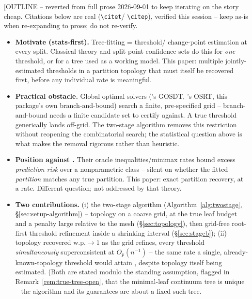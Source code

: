 \documentclass[11pt]{article}
\theoremstyle{plain}
\theoremstyle{definition}
\theoremstyle{remark}
\begin{document}
[OUTLINE -- reverted from full prose 2026-09-01 to keep iterating on the
story cheap. Citations below are real (\texttt{\textbackslash citet}/
\texttt{\textbackslash citep}), verified this session -- keep as-is when
re-expanding to prose; do not re-verify.
\begin{itemize}
\item \textbf{Motivate (stats-first).} Tree-fitting = threshold/
  change-point estimation at every split. Classical theory
  \citep{chan1993,yaoau1989,baiperron1998,boysen2009,seijosen2011} and
  split-point confidence sets \citep{banerjee2007} do this for \emph{one}
  threshold, or for a tree used as a working model. This paper: multiple
  jointly-estimated thresholds in a partition topology that must itself be
  recovered first, before any individual rate is meaningful.
\item \textbf{Practical obstacle.} Global-optimal solvers
  (\citealt{lin2020gosdt}'s GOSDT, \citealt{zhang2023osrt}'s OSRT, this
  package's own branch-and-bound) search a finite, pre-specified grid --
  branch-and-bound needs a finite candidate set to certify against. A true
  threshold generically lands off-grid. The two-stage algorithm removes
  this restriction without reopening the combinatorial search; the
  statistical question above is what makes the removal rigorous rather
  than heuristic.
\item \textbf{Position against \citet{xu2026}.} Their oracle
  inequalities/minimax rates bound excess \emph{prediction risk} over a
  nonparametric class -- silent on whether the fitted \emph{partition}
  matches any true partition. This paper: exact partition recovery, at a
  rate. Different question; not addressed by that theory.
\item \textbf{Two contributions.} (i) the two-stage algorithm
  (Algorithm~\ref{alg:twostage}, \S\ref{sec:setup-algorithm}) --
  topology on a coarse grid, at the true leaf budget and a penalty large
  relative to the mesh (\S\ref{sec:topology}), then grid-free root-first
  threshold refinement inside a shrinking interval (\S\ref{sec:stageb});
  (ii)
  topology recovered w.p.$\to1$ as the grid refines, every threshold
  \emph{simultaneously} superconsistent at $O_p(n^{-1})$ -- the same rate a
  single, already-known-topology threshold would attain
  \citep{chan1993}, despite topology itself being estimated. (Both are
  stated modulo the standing assumption, flagged in
  Remark~\ref{rem:true-tree-open}, that the minimal-leaf continuum tree is
  unique -- the algorithm and its guarantees are about a fixed such tree.

\end{itemize}
\end{document}

